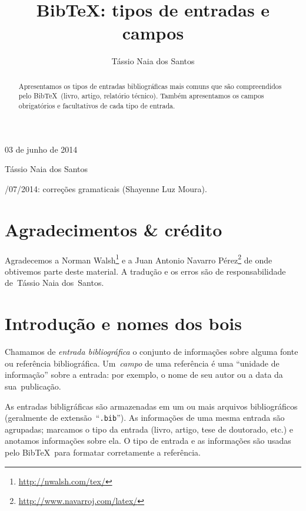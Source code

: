 \documentclass[article,openany]{memoir}
\title{Bib\TeX: tipos de entradas e campos}
\author{Tássio Naia dos Santos}
\begin{document}



\hfill 03 de junho de 2014

\medskip

\noindent Tássio Naia dos Santos

\medskip

/07/2014: correções gramaticais (Shayenne Luz Moura).

\bigskip

\begin{abstract}
Apresentamos os tipos de entradas bibliográficas mais comuns
que são compreendidos pelo Bib\TeX\ (livro, artigo, relatório
técnico). Também apresentamos os campos obrigatórios e facultativos de
cada tipo de entrada.
\end{abstract}


\chapter*{Agradecimentos \& crédito}

Agradecemos a Norman Walsh\footnote{\url{http://nwalsh.com/tex/}} e a
Juan Antonio Navarro
Pérez\footnote{\url{http://www.navarroj.com/latex/}} de onde obtivemos
parte deste material. A tradução e os erros são de responsabilidade
de~Tássio Naia dos~Santos.

\chapter{Introdução e nomes dos bois}

Chamamos de \emph{entrada bibliográfica} o conjunto de informações
sobre alguma fonte ou referência bibliográfica. Um~\emph{campo} de uma
referência é uma ``unidade de informação'' sobre a entrada: por
exemplo, o nome de seu autor ou a data da sua~publicação.

As entradas bibligráficas são armazenadas em um ou mais arquivos
bibliográficos (geralmente de extensão~``\texttt{.bib}''). As
informações de uma mesma entrada são agrupadas; marcamos o tipo da entrada
(livro, artigo, tese de doutorado, etc.) e anotamos informações sobre
ela. O tipo de entrada e as informações são usadas pelo
Bib\TeX\ para formatar corretamente a referência.
\end{document}
